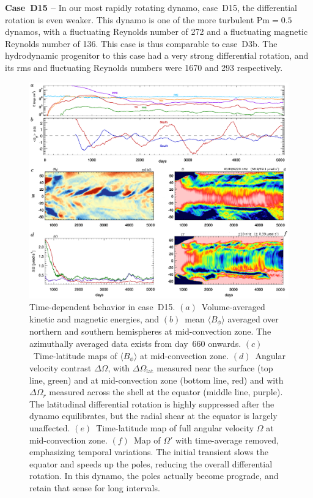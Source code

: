 \textbf{Case~D15 --} In our most rapidly rotating dynamo, case~D15,
the differential rotation is even weaker.  This dynamo is one of the
more turbulent $\mathrm{Pm}=0.5$ dynamos, with a fluctuating
Reynolds number of 272 and a fluctuating magnetic Reynolds number of
136.  This case is thus comparable to case~D3b.  The hydrodynamic
progenitor to this case had a very strong differential rotation, and
its rms and fluctuating Reynolds numbers were 1670 and 293 respectively.


\begin{figure}
  \includegraphics[width=\linewidth]{figs/chapter_8/time_history_mmc_vturf_15.eps}
  \caption[Time-dependent behavior in case~D15]
	  {Time-dependent behavior in case~D15.  
          $(a)$~Volume-averaged kinetic and magnetic energies, and
            $(b)$~mean $\langle B_\phi \rangle$ averaged over northern
            and southern hemispheres at mid-convection zone.  The
            azimuthally averaged data exists from day~660 onwards.
            $(c)$~Time-latitude maps of $\langle B_\phi \rangle$ at
            mid-convection zone.  $(d)$~Angular velocity contrast
            $\Delta \Omega$, with $\Delta \Omega_\mathrm{lat}$
            measured near the surface (top line, green) and at
            mid-convection zone (bottom line, red) and with $\Delta
            \Omega_r$ measured across the shell at the equator (middle
            line, purple).  The latitudinal differential rotation is
            highly suppressed after the dynamo equilibrates, but the
            radial shear at the equator is largely unaffected.
            $(e)$~Time-latitude map of full angular velocity $\Omega$
            at mid-convection zone.  $(f)$~Map of $\Omega'$ with
            time-average removed, emphasizing temporal variations.
            The initial transient slows the equator and speeds up the
            poles, reducing the overall differential rotation.  In
            this dynamo, the poles actually become prograde, and
            retain that sense for long intervals.
          \label{fig:D15}}
\end{figure}

